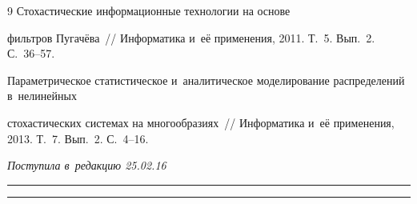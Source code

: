 {{\begin{thebibliography}{9}
 Стохастические информационные технологии на основе 


фильтров Пугачёва~/\!\!/ Информатика и~её применения, 2011. Т.~5. Вып.~2. С.~36--57.









Параметрическое статистическое и~аналитическое моделирование распределений в~нелинейных 


стохастических системах на многообразиях~/\!\!/ Информатика и~её применения, 2013. Т.~7. Вып.~2. С.~4--16.


     \end{thebibliography}


} }








\vspace*{-4pt}





\hfill{\small\textit{Поступила в~редакцию 25.02.16}}














\vspace*{6pt}





\hrule





\vspace*{2pt}





\hrule










\vspace*{-2pt}











\def\tit{NORMAL PUGACHEV  FILTERS  FOR~STATE


 LINEAR AUTOCORRELATED STOCHASTIC SYSTEMS}





